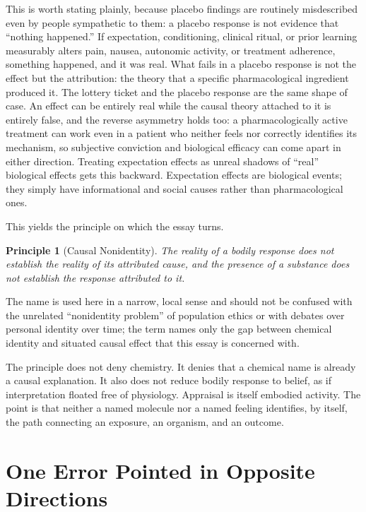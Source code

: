 \documentclass[11pt]{article}
\newtheorem*{principle}{Principle}
\begin{document}
This is worth stating plainly, because placebo findings are routinely misdescribed even by people sympathetic to them: a placebo response is not evidence that ``nothing happened.'' If expectation, conditioning, clinical ritual, or prior learning measurably alters pain, nausea, autonomic activity, or treatment adherence, something happened, and it was real. What fails in a placebo response is not the effect but the attribution: the theory that a specific pharmacological ingredient produced it. The lottery ticket and the placebo response are the same shape of case. An effect can be entirely real while the causal theory attached to it is entirely false, and the reverse asymmetry holds too: a pharmacologically active treatment can work even in a patient who neither feels nor correctly identifies its mechanism, so subjective conviction and biological efficacy can come apart in either direction. Treating expectation effects as unreal shadows of ``real'' biological effects gets this backward. Expectation effects are biological events; they simply have informational and social causes rather than pharmacological ones.

This yields the principle on which the essay turns.

\begin{principle}[Causal Nonidentity]
The reality of a bodily response does not establish the reality of its attributed cause, and the presence of a substance does not establish the response attributed to it.
\end{principle}

The name is used here in a narrow, local sense and should not be confused with the unrelated ``nonidentity problem'' of population ethics or with debates over personal identity over time; the term names only the gap between chemical identity and situated causal effect that this essay is concerned with.

The principle does not deny chemistry. It denies that a chemical name is already a causal explanation. It also does not reduce bodily response to belief, as if interpretation floated free of physiology. Appraisal is itself embodied activity. The point is that neither a named molecule nor a named feeling identifies, by itself, the path connecting an exposure, an organism, and an outcome.

\section{One Error Pointed in Opposite Directions}
\end{document}

